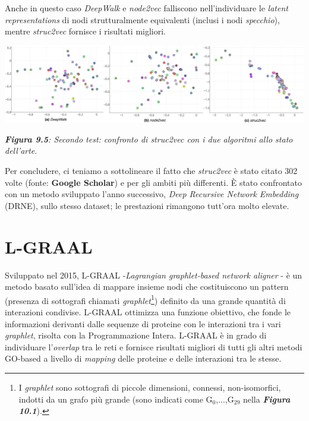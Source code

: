 \documentclass[11pt]{article}
\begin{document}
Anche in questo caso \textit{DeepWalk} e \textit{node2vec} falliscono nell'individuare le \textit{latent representations} di nodi strutturalmente equivalenti (inclusi i nodi \textit{specchio}), mentre \textit{struc2vec} fornisce i risultati migliori.

\begin{center}
\includegraphics[scale=0.35]{a4}

\begin{small}\textit{\textbf{Figura 9.5}: Secondo test: confronto di struc2vec con i due algoritmi allo stato dell'arte}.\end{small}
\end{center}

Per concludere, ci teniamo a sottolineare il fatto che \textit{struc2vec} è stato citato 302 volte (fonte: \textbf{Google Scholar}) e per gli ambiti più differenti. \`E stato confrontato con un metodo sviluppato l'anno successivo, \textit{Deep Recursive Network Embedding} (DRNE), sullo stesso dataset; le prestazioni rimangono tutt'ora molto elevate.

\pagebreak
\section{L-GRAAL}
Sviluppato nel 2015, L-GRAAL -\textit{Lagrangian graphlet-based network aligner} - è un metodo basato sull'idea di mappare insieme nodi che costituiscono un pattern (presenza di sottografi chiamati \textit{graphlet}\footnote{I \textit{graphlet} sono sottografi di piccole dimensioni, connessi, non-isomorfici, indotti da un grafo più grande (sono indicati come G$_0$,...,G$_{29}$ nella \textit{\textbf{Figura 10.1}}).}) definito da una grande quantità di interazioni condivise. L-GRAAL ottimizza una funzione obiettivo, che fonde le informazioni derivanti dalle sequenze di proteine con le interazioni tra i vari \textit{graphlet}, risolta con la Programmazione Intera. L-GRAAL è in grado di individuare l'\textit{overlap} tra le reti e fornisce risultati migliori di tutti gli altri metodi GO-based a livello di \textit{mapping} delle proteine e delle interazioni tra le stesse.\\
\end{document}
